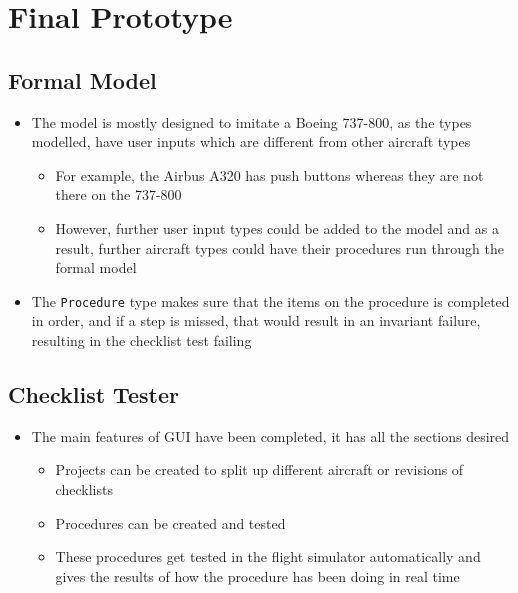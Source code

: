 \documentclass[../dissertation.tex]{subfiles}
\begin{document}
\section{Final Prototype}
\subsection{Formal Model}
\begin{itemize}
  \item The model is mostly designed to imitate a Boeing 737-800,
    as the types modelled, have user inputs which are different from
    other aircraft types
    \begin{itemize}
      \item For example, the Airbus A320 has push buttons whereas
      they are not there on the 737-800
      \item However, further user input types could be added to the model
        and as a result, further aircraft types could have their
        procedures run through the formal model
    \end{itemize}
  \item The \lstinline|Procedure| type makes sure that the items on
    the procedure is completed in order, and if a step is missed,
    that would result in an invariant failure, resulting in the
    checklist test failing
\end{itemize}

\subsection{Checklist Tester}
\begin{itemize}
  \item The main features of GUI have been completed, it has all the sections desired
  \begin{itemize}
    \item Projects can be created to split up different aircraft
      or revisions of checklists
    \item Procedures can be created and tested
    \item These procedures get tested in the flight simulator automatically
      and gives the results of how the procedure has been doing in
      real time
  \end{itemize}
\end{itemize}
\end{document}
